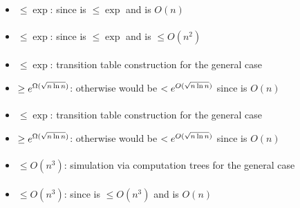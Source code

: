 \paragraph{\OMOLA{}\tto\TNFA}
\begin{itemize}
	\item $\le\exp$: since \hyperref[cost:OM1LAto1NFAu]{\OMOLA{}\tto\ONFA} is $\le\exp$ and \ONFA{}\tto\TNFA is $O(n)$
\end{itemize}
\paragraph{\OMOLA{}\tto\OMODLA}
\begin{itemize}
	\item $\le\exp$: since \hyperref[cost:OM1LAto1NFAu]{\OMOLA{}\tto\ONFA} is $\le\exp$ and \hyperref[cost:1NFAtoOM1DLAu]{\ONFA{}\tto\OMODLA} is $\le O(n^2)$
\end{itemize}
\paragraph{\OMODLA{}\tto\ODFA}
\begin{itemize}
	\item $\le\exp$: transition table construction for the general case \cite{PigPis14}
	\item $\ge e^{\Omega(\sqrt{n\ln n})}$: otherwise \hyperref[cost:2DFAto1DFAu]{\TDFA{}\tto\ODFA} would be $<e^{O(\sqrt{n\ln n})}$ since \TDFA{}\tto\OMODLA is $O(n)$
\end{itemize}
\paragraph{\OMODLA{}\tto\ONFA}
\begin{itemize}
	\item $\le\exp$: transition table construction for the general case \cite{PigPis14}
	\item $\ge e^{\Omega(\sqrt{n\ln n})}$: otherwise \hyperref[cost:2DFAto1NFAu]{\TDFA{}\tto\ONFA} would be $<e^{O(\sqrt{n\ln n})}$ since \TDFA{}\tto\OMODLA is $O(n)$
\end{itemize}
\paragraph{\OMODLA{}\tto\TDFA}\label{cost:OM1DLAto2DFAu}
\begin{itemize}
	\item $\le O(n^3)$: simulation via computation trees for the general case \cite{PigPri23a}
\end{itemize}
\paragraph{\OMODLA{}\tto\TNFA}
\begin{itemize}
	\item $\le O(n^3)$: since \hyperref[cost:OM1DLAto2DFAu]{\OMODLA{}\tto\TDFA} is $\le O(n^3)$ and \TDFA{}\tto\TNFA is $O(n)$
\end{itemize}
